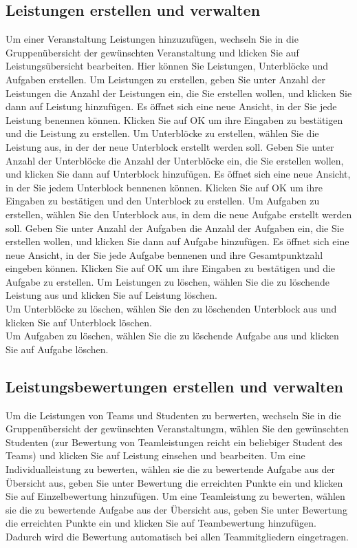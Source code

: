 \documentclass{Handbuch}
\begin{document}
\subsection{Leistungen erstellen und verwalten}
Um einer Veranstaltung Leistungen hinzuzufügen, wechseln Sie in die Gruppenübersicht der gewünschten Veranstaltung und klicken Sie auf \frqq Leistungsübersicht bearbeiten\flqq. Hier können Sie Leistungen, Unterblöcke und Aufgaben erstellen.
Um Leistungen zu erstellen, geben Sie unter \glqq Anzahl der Leistungen\grqq{} die Anzahl der Leistungen ein, die Sie erstellen wollen, und klicken Sie dann auf \frqq Leistung hinzufügen\flqq. Es öffnet sich eine neue Ansicht, in der Sie jede Leistung benennen können. Klicken Sie auf \frqq OK\flqq{} um ihre Eingaben zu bestätigen und die Leistung zu erstellen. 
Um Unterblöcke zu erstellen, wählen Sie die Leistung aus, in der der neue Unterblock erstellt werden soll. Geben Sie unter \glqq Anzahl der Unterblöcke\grqq{} die Anzahl der Unterblöcke ein, die Sie erstellen wollen, und klicken Sie dann auf \frqq Unterblock hinzufügen\flqq. Es öffnet sich eine neue Ansicht, in der Sie jedem Unterblock bennenen können. Klicken Sie auf \frqq OK\flqq{} um ihre Eingaben zu bestätigen und den Unterblock zu erstellen. 
Um Aufgaben zu erstellen, wählen Sie den Unterblock aus, in dem die neue Aufgabe erstellt werden soll. Geben Sie unter \glqq Anzahl der Aufgaben\grqq{} die Anzahl der Aufgaben ein, die Sie erstellen wollen, und klicken Sie dann auf \frqq Aufgabe hinzufügen\flqq. Es öffnet sich eine neue Ansicht, in der Sie jede Aufgabe bennenen und ihre Gesamtpunktzahl eingeben können. Klicken Sie auf \frqq OK\flqq{} um ihre Eingaben zu bestätigen und die Aufgabe zu erstellen.
Um Leistungen zu löschen, wählen Sie die zu löschende Leistung aus und klicken Sie auf \frqq Leistung löschen\flqq.\\
Um Unterblöcke zu löschen, wählen Sie den zu löschenden Unterblock aus und klicken Sie auf \frqq Unterblock löschen\flqq.\\
Um Aufgaben zu löschen, wählen Sie die zu löschende Aufgabe aus und klicken Sie auf \frqq Aufgabe löschen\flqq.\\

\subsection{Leistungsbewertungen erstellen und verwalten}
Um die Leistungen von Teams und Studenten zu berwerten, wechseln Sie in die Gruppenübersicht der gewünschten Veranstaltungm, wählen Sie den gewünschten Studenten (zur Bewertung von Teamleistungen reicht ein beliebiger Student des Teams) und klicken Sie auf \frqq Leistung einsehen und bearbeiten\flqq. 
Um eine Individualleistung zu bewerten, wählen sie die zu bewertende Aufgabe aus der Übersicht aus, geben Sie unter \glqq Bewertung\grqq{} die erreichten Punkte ein und klicken Sie auf \frqq Einzelbewertung hinzufügen\flqq.
Um eine Teamleistung zu bewerten, wählen sie die zu bewertende Aufgabe aus der Übersicht aus, geben Sie unter \glqq Bewertung\grqq{} die erreichten Punkte ein und klicken Sie auf \frqq Teambewertung hinzufügen\flqq. Dadurch wird die Bewertung automatisch bei allen Teammitgliedern eingetragen. 
\end{document}
